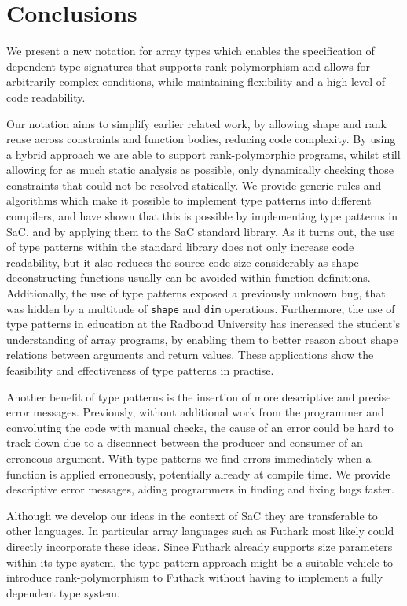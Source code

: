 \documentclass[sigconf,screen]{acmart}
\begin{document}
\section{Conclusions}
We present a new notation for array types which enables the specification of dependent type signatures that supports rank-polymorphism and allows for arbitrarily complex conditions, while maintaining flexibility and a high level of code readability.

Our notation aims to simplify earlier related work, by allowing shape and rank reuse across constraints and function bodies, reducing code complexity.
By using a hybrid approach we are able to support rank-polymorphic programs, whilst still allowing for as much static analysis as possible, only dynamically checking those constraints that could not be resolved statically.
We provide generic rules and algorithms which make it possible to implement type patterns into different compilers, and have shown that this is possible by implementing type patterns in SaC, and by applying them to the SaC standard library.
As it turns out, the use of type patterns within the standard library does not only increase code readability, but it also reduces the source code size considerably as shape deconstructing functions usually can be avoided within function definitions.
Additionally, the use of type patterns exposed a previously unknown bug, that was hidden by a multitude of \texttt{shape} and \texttt{dim} operations.
Furthermore, the use of type patterns in education at the Radboud University has increased the student's understanding of array programs, by enabling them to better reason about shape relations between arguments and return values.
These applications show the feasibility and effectiveness of type patterns in practise.

Another benefit of type patterns is the insertion of more descriptive and precise error messages.
Previously, without additional work from the programmer and convoluting the code with manual checks, the cause of an error could be hard to track down due to a disconnect between the producer and consumer of an erroneous argument.
With type patterns we find errors immediately when a function is applied erroneously, potentially already at compile time.
We provide descriptive error messages, aiding programmers in finding and fixing bugs faster.

Although we develop our ideas in the context of SaC they are transferable to other languages.
In particular array languages such as Futhark most likely could directly incorporate these ideas.
Since Futhark already supports size parameters within its type system, the type pattern approach might be a suitable vehicle to introduce rank-polymorphism to Futhark without having to implement a fully dependent type system.
\end{document}
